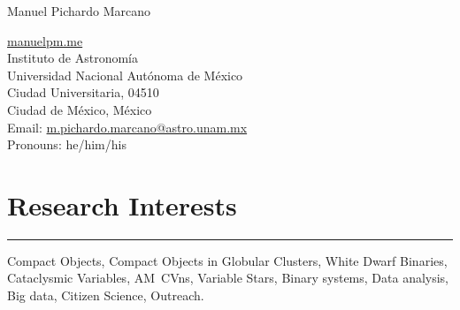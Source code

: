 \documentclass[letterpaper,10pt]{article}
\def\name{Manuel Pichardo Marcano}
\begin{document}
\begin{huge}
\name
\end{huge}





\vspace{.3 cm}

\begin{minipage}{0.6\linewidth}
  \href{www.manuelpm.me}{manuelpm.me} \\
Instituto de Astronom\'ia \\
  Universidad Nacional Aut\'onoma de M\'exico \\
  Ciudad Universitaria, 04510\\
  Ciudad de M\'exico, M\'exico \\
Email:  \href{mailto:m.pichardo.marcano@astro.unam.mx}{m.pichardo.marcano@astro.unam.mx}\\
 Pronouns: he/him/his 
\end{minipage}

\section*{Research Interests}

\hrule
\vspace{.3 cm}


Compact Objects, Compact Objects in Globular Clusters, White Dwarf Binaries, Cataclysmic Variables, AM~CVns, Variable Stars, Binary systems, Data analysis, Big data, Citizen Science, Outreach. 
\end{document}
